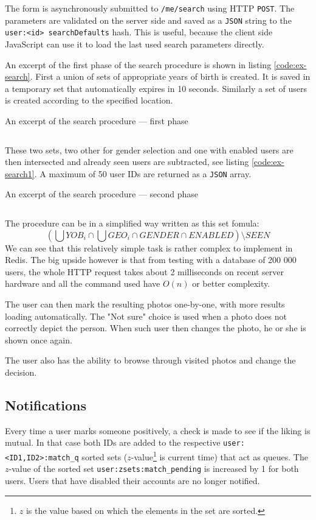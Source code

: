 \documentclass[12pt,oneside]{fithesis}
\begin{document}
		The form is asynchronously submitted to \texttt{/me/search} using HTTP \texttt{POST}. The parameters are validated on the server side and saved as a \texttt{JSON} string to the \texttt{user:<id> searchDefaults} hash. This is useful, because the client side JavaScript can use it to load the last used search parameters directly.
		
		An excerpt of the first phase of the search procedure is shown in listing \ref{code:ex-search}. First a union of sets of appropriate years of birth is created. It is saved in a temporary set that automatically expires in 10 seconds. Similarly a set of users is created according to the specified location.
		
		\begin{program}[h]
		\caption{An excerpt of the search procedure --- first phase}
		\label{code:ex-search}
		\inputminted[fontsize=\footnotesize, linenos=false, gobble=6]{javascript}{ex-search.js}
		\end{program}

		These two sets, two other for gender selection and one with enabled users are then intersected and already seen users are subtracted, see listing \ref{code:ex-search1}. A maximum of 50 user IDs are returned as a \texttt{JSON} array.
		
		\begin{program}[h]
		\caption{An excerpt of the search procedure --- second phase}
		\label{code:ex-search1}
		\inputminted[fontsize=\footnotesize, linenos=false]{javascript}{ex-search1.js}
		\end{program}
	
		The procedure can be in a simplified way written as this set fomula:
		\[
			\left( \bigcup YOB_i \cap \bigcup GEO_i \cap GENDER \cap ENABLED \right) \setminus SEEN
		\]
		We can see that this relatively simple task is rather complex to implement in Redis. The big upside however is that from testing with a database of 200 000 users, the whole HTTP request takes about 2 milliseconds on recent server hardware and all the command used have $O(n)$ or better complexity.
	
		The user can then mark the resulting photos one-by-one, with more results loading automatically. The "Not sure" choice is used when a photo does not correctly depict the person. When such user then changes the photo, he or she is shown once again. 
		
		The user also has the ability to browse through visited photos and change the decision.
		\clearpage
	\subsection{Notifications}
		Every time a user marks someone positively, a check is made to see if the liking is mutual. In that case  both IDs are added to the respective \texttt{user:<ID1,ID2>:match\_q} sorted sets ($z$-value\footnote{$z$ is the value based on which the elements in the set are sorted.} is current time) that act as queues. The $z$-value of the sorted set \texttt{user:zsets:match\_pending} is increased by 1 for both users. Users that have disabled their accounts are no longer notified.
		
\end{document}

